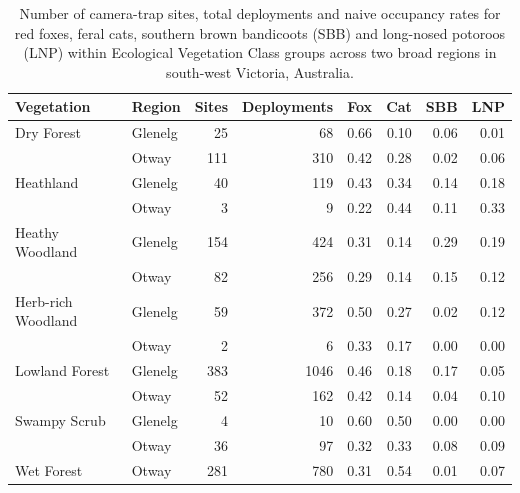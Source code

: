\documentclass[11pt,a4paper,titlepage,twoside,openright]{style/unimelbthesis}
\begin{document}
\begin{mainmatter}
\begingroup\fontsize{10}{12}\selectfont
\begin{longtable}[t]{llrrrrrr}
\caption{\label{tab:occ-naive}Number of camera-trap sites, total deployments and naive occupancy rates for red foxes, feral cats, southern brown bandicoots (SBB) and long-nosed potoroos (LNP) within Ecological Vegetation Class groups across two broad regions in south-west Victoria, Australia.}\\
\toprule
Vegetation & Region & Sites & Deployments & Fox & Cat & SBB & LNP\\
\midrule
Dry Forest & Glenelg & 25 & 68 & 0.66 & 0.10 & 0.06 & 0.01\\
 & Otway & 111 & 310 & 0.42 & 0.28 & 0.02 & 0.06\\
Heathland & Glenelg & 40 & 119 & 0.43 & 0.34 & 0.14 & 0.18\\
 & Otway & 3 & 9 & 0.22 & 0.44 & 0.11 & 0.33\\
Heathy Woodland & Glenelg & 154 & 424 & 0.31 & 0.14 & 0.29 & 0.19\\
\addlinespace
 & Otway & 82 & 256 & 0.29 & 0.14 & 0.15 & 0.12\\
Herb-rich Woodland & Glenelg & 59 & 372 & 0.50 & 0.27 & 0.02 & 0.12\\
 & Otway & 2 & 6 & 0.33 & 0.17 & 0.00 & 0.00\\
Lowland Forest & Glenelg & 383 & 1046 & 0.46 & 0.18 & 0.17 & 0.05\\
 & Otway & 52 & 162 & 0.42 & 0.14 & 0.04 & 0.10\\
\addlinespace
Swampy Scrub & Glenelg & 4 & 10 & 0.60 & 0.50 & 0.00 & 0.00\\
 & Otway & 36 & 97 & 0.32 & 0.33 & 0.08 & 0.09\\
Wet Forest & Otway & 281 & 780 & 0.31 & 0.54 & 0.01 & 0.07\\
\bottomrule
\end{longtable}
\endgroup{}

\newpage

\(~\)

\(~\)

\(~\)
\begin{figure}


\end{figure}
\end{mainmatter}
\end{document}
